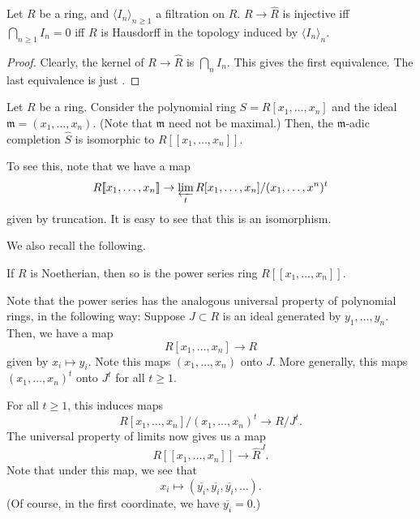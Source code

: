 \documentclass[12pt]{article}
\begin{document}
\begin{prop} \label{prop:R-to-completion-injective-hausdorff}
	Let $R$ be a ring, and $\langle I_{n} \rangle_{n \ge 1}$ a filtration on $R$. \newline
	$R \to \widehat{R}$ is injective iff $\bigcap_{n \ge 1} I_{n} = 0$ iff $R$ is Hausdorff in the topology induced by $\langle I_{n} \rangle_{n}$.
\end{prop}
\begin{proof} 
	Clearly, the kernel of $R \to \widehat{R}$ is $\bigcap_{n} I_{n}$. This gives the first equivalence. The last equivalence is just .
\end{proof}

\begin{ex}
	Let $R$ be a ring. Consider the polynomial ring $S = R[x_{1}, \ldots, x_{n}]$ and the ideal $\mathfrak{m} = (x_{1}, \ldots, x_{n})$. (Note that $\mathfrak{m}$ need not be maximal.) \newline
	Then, the $\mathfrak{m}$-adic completion $\widehat{S}$ is isomorphic to $R[\![x_{1}, \ldots, x_{n}]\!]$.

	To see this, note that we have a map
	\begin{equation*} 
		R[\![x_{1}, \ldots, x_{n}]\!] \to \varprojlim_{t} R[x_{1}, \ldots, x_{n}]/(x_{1}, \ldots, x^{n})^{t}
	\end{equation*}
	given by truncation. It is easy to see that this is an isomorphism.
\end{ex}

We also recall the following.
\begin{thm}
	If $R$ is Noetherian, then so is the power series ring $R[\![x_{1}, \ldots, x_{n}]\!]$.
\end{thm}

Note that the power series has the analogous universal property of polynomial rings, in the following way: Suppose $J \subset R$ is an ideal generated by $y_{1}, \ldots, y_{n}$. \newline
Then, we have a map
\begin{equation*} 
	R[x_{1}, \ldots, x_{n}] \to R
\end{equation*}
given by $x_{i} \mapsto y_{i}$. Note this maps $(x_{1}, \ldots, x_{n})$ onto $J$. More generally, this maps $(x_{1}, \ldots, x_{n})^{t}$ onto $J^{t}$ for all $t \ge 1$.

For all $t \ge 1$, this induces maps
\begin{equation*} 
	R[x_{1}, \ldots, x_{n}]/(x_{1}, \ldots, x_{n})^{t} \to R/J^{t}.	
\end{equation*}
The universal property of limits now gives us a map
\begin{equation*} 
	R[\![x_{1}, \ldots, x_{n}]\!] \to \widehat{R}^{J}.
\end{equation*}
Note that under this map, we see that
\begin{equation*} 
	x_{i} \mapsto (\overline{y_{i}}, \overline{y_{i}}, \overline{y_{i}}, \ldots).
\end{equation*}
(Of course, in the first coordinate, we have $\overline{y_{i}} = 0$.)
\end{document}
